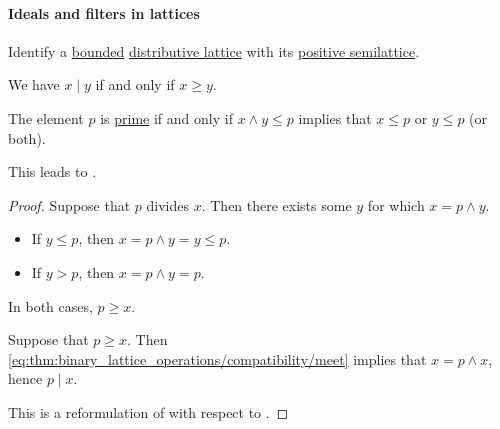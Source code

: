 \paragraph{Ideals and filters in lattices}

\begin{proposition}\label{thm:lattice_divisibility}
  Identify a \hyperref[def:semilattice/bounded]{bounded} \hyperref[def:semilattice/distributive_lattice]{distributive lattice} with its \hyperref[ex:def:semiring/lattice]{positive semilattice}.

  \begin{thmenum}
     We have \( x \mid y \) if and only if \( x \geq y \).

     The element \( p \) is \hyperref[def:domain_divisibility/prime]{prime} if and only if \( x \wedge y \leq p \) implies that \( x \leq p \) or \( y \leq p \) (or both).
  \end{thmenum}
\end{proposition}
\begin{comments}
  \item This leads to .
\end{comments}
\begin{proof}
  \SufficiencySubProof* Suppose that \( p \) divides \( x \). Then there exists some \( y \) for which \( x = p \wedge y \).
  \begin{itemize}
    \item If \( y \leq p \), then \( x = p \wedge y = y \leq p \).
    \item If \( y > p \), then \( x = p \wedge y = p \).
  \end{itemize}

  In both cases, \( p \geq x \).

  \NecessitySubProof* Suppose that \( p \geq x \). Then \eqref{eq:thm:binary_lattice_operations/compatibility/meet} implies that \( x = p \wedge x \), hence \( p \mid x \).

   This is a reformulation of  with respect to .
\end{proof}


